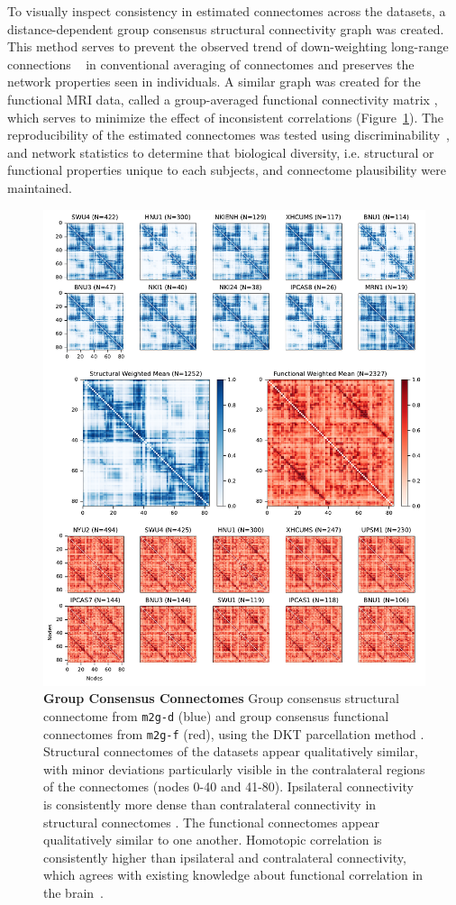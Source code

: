 To visually inspect consistency in estimated connectomes across the datasets, a distance-dependent group consensus structural connectivity graph was created. This method serves to prevent the observed trend of down-weighting long-range connections ~\cite{struct_consensus} in conventional averaging of connectomes and preserves the network properties seen in individuals. A similar graph was created for the functional MRI data, called a group-averaged functional connectivity matrix \cite{func_consensus}, which serves to minimize the effect of inconsistent correlations (Figure~\ref{fig:meancon}). The reproducibility of the estimated connectomes was tested using discriminability~\cite{discriminability}, and network statistics to determine that biological diversity, i.e. structural or functional properties unique to each subjects, and connectome plausibility were maintained.


\begin{figure}%
	\centering
	\includegraphics[width=.7\textwidth]{figures/m2g/figure2.pdf}
    \caption[Group consensus structural connectome from  \texttt{m2g-d} (blue) and group consensus functional  connectomes from \texttt{m2g-f} (red).]
    {\textbf{Group Consensus Connectomes}
  Group consensus structural connectome from  \texttt{m2g-d} (blue) and group consensus functional  connectomes from \texttt{m2g-f} (red), using the DKT parcellation method \cite{desikan2006automated}. Structural connectomes of the datasets appear qualitatively similar, with minor deviations particularly visible in the contralateral regions of the connectomes (nodes 0-40 and 41-80). Ipsilateral connectivity is consistently more dense than contralateral connectivity in structural connectomes \cite{ipsi-struct}. The functional connectomes appear qualitatively similar to one another. Homotopic correlation is consistently higher than ipsilateral and contralateral connectivity, which agrees with existing knowledge about functional correlation in the brain~\cite{Stark-ipsi,Biswal-ipsi,Zuo-ipsi}.
  }
	\label{fig:meancon}
\end{figure}


